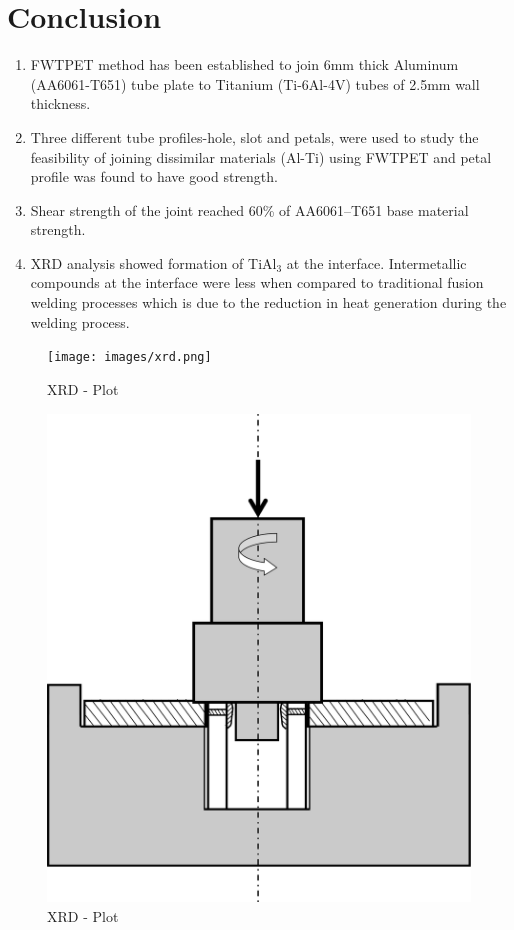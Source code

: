 \documentclass[3p]{elsarticle}
\begin{document}
\section{Conclusion}
\label{sec:Conclusion}
\begin{enumerate}[1.]
\item FWTPET method has been established to join 6mm thick Aluminum (AA6061-T651) tube plate to Titanium (Ti-6Al-4V) tubes of 2.5mm wall thickness.
\item Three different tube profiles-hole, slot and petals, were used to study the feasibility of joining dissimilar materials (Al-Ti) using FWTPET and petal profile was found to have good strength.
\item Shear strength of the joint reached 60\% of AA6061–T651 base material strength.
\item XRD analysis showed formation of TiAl$_{3}$ at the interface. Intermetallic compounds at the interface were less when compared to traditional fusion welding processes which is due to the reduction in heat generation during the welding process.
\end{enumerate}



\iffalse

\begin{figure}[H]
\centering
\texttt{[image: images/xrd.png]}
\caption{XRD - Plot}
\label{fig:xrd-plot}
\end{figure}


\begin{figure}[!htbp]
\centering
\includegraphics[width=\textwidth,keepaspectratio]{images/welding-set-up.png}
\caption{XRD - Plot}
\label{fig:xrd-plot}
\end{figure}
\end{document}
